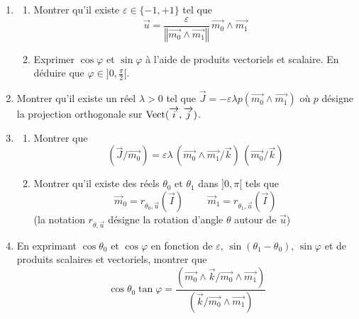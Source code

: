 \begin{enumerate}
 \item 
\begin{enumerate}
 \item  Montrer qu'il existe $\varepsilon \in\{-1,+1\}$ tel que 
\begin{displaymath}
 \overrightarrow{u} = 
\frac{\varepsilon}{\left\Vert\overrightarrow{m_0}\wedge \overrightarrow{m_1}\right\Vert}\,\overrightarrow{m_0}\wedge \overrightarrow{m_1}
\end{displaymath}
 \item Exprimer $\cos \varphi$ et $\sin \varphi$ à l'aide de produits vectoriels et scalaire. En déduire que $\varphi \in ]0,\frac{\pi}{2}[$.
\end{enumerate}

 \item Montrer qu'il existe un réel $\lambda >0$ tel que  $\overrightarrow{J} = -\varepsilon\lambda p(\overrightarrow{m_0}\wedge \overrightarrow{m_1})$ où $p$ désigne la projection orthogonale sur $\operatorname{Vect}(\overrightarrow{i},\overrightarrow{j})$.
 
 \item \begin{enumerate}
 \item Montrer que 
\begin{displaymath}
 (\overrightarrow{J}/\overrightarrow{m_0}) =
\varepsilon \lambda \,(\overrightarrow{m_0}\wedge \overrightarrow{m_1}/\overrightarrow{k})\,
(\overrightarrow{m_0}/ \overrightarrow{k})  
\end{displaymath}

 \item Montrer qu'il existe des réels $\theta_0$ et $\theta_1$ dans $]0,\pi[$ tels que 
\begin{displaymath}
 \overrightarrow{m}_0 = r_{\theta_0,\overrightarrow{u}}(\overrightarrow{I})
\hspace{1cm}
\overrightarrow{m}_1 = r_{\theta_1,\overrightarrow{u}}(\overrightarrow{I})
\end{displaymath}
(la notation $r_{\theta,\overrightarrow{u}}$ désigne la rotation d'angle $\theta$ autour de $\overrightarrow{u}$) 
\end{enumerate}
\item En exprimant $\cos \theta_0$ et $\cos \varphi$ en fonction de $\varepsilon$, $\sin(\theta_1-\theta_0)$, $\sin \varphi$ et de produits scalaires et vectoriels, montrer que
\begin{displaymath}
 \cos \theta_0 \tan \varphi = 
\frac{(\overrightarrow{m_0}\wedge \overrightarrow{k}/\overrightarrow{m_0}\wedge \overrightarrow{m_1})}
{(\overrightarrow{k}/\overrightarrow{m_0}\wedge \overrightarrow{m_1})}
\end{displaymath}

\end{enumerate}